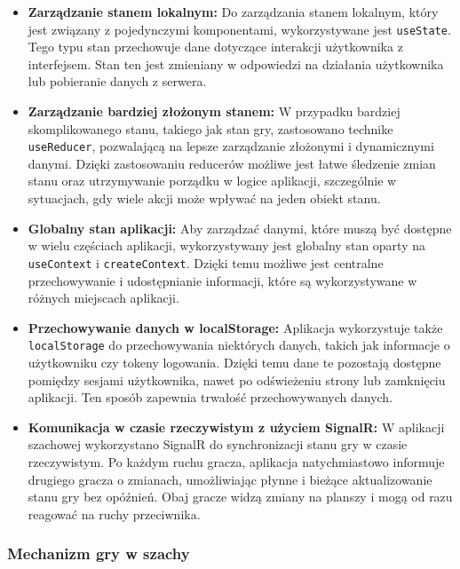 \documentclass[twoside]{projektInzynierskiMS1}
\begin{document}
\begin{itemize}
    \item \textbf{Zarządzanie stanem lokalnym:} Do zarządzania stanem lokalnym, który jest związany z pojedynczymi komponentami, wykorzystywane jest \texttt{useState}. Tego typu stan przechowuje dane dotyczące interakcji użytkownika z interfejsem. Stan ten jest zmieniany w odpowiedzi na działania użytkownika lub pobieranie danych z serwera.

    \item \textbf{Zarządzanie bardziej złożonym stanem:} W przypadku bardziej skomplikowanego stanu, takiego jak stan gry, zastosowano technike \texttt{useReducer}, pozwalającą na lepsze zarządzanie złożonymi i dynamicznymi danymi. Dzięki zastosowaniu reducerów możliwe jest łatwe śledzenie zmian stanu oraz utrzymywanie porządku w logice aplikacji, szczególnie w sytuacjach, gdy wiele akcji może wpływać na jeden obiekt stanu.

    \item \textbf{Globalny stan aplikacji:} Aby zarządzać danymi, które muszą być dostępne w wielu częściach aplikacji, wykorzystywany jest globalny stan oparty na \texttt{useContext} i \texttt{createContext}. Dzięki temu możliwe jest centralne przechowywanie i udostępnianie informacji, które są wykorzystywane w różnych miejscach aplikacji.

    \item \textbf{Przechowywanie danych w localStorage:} Aplikacja wykorzystuje także \texttt{localStorage} do przechowywania niektórych danych, takich jak informacje o użytkowniku czy tokeny logowania. Dzięki temu dane te pozostają dostępne pomiędzy sesjami użytkownika, nawet po odświeżeniu strony lub zamknięciu aplikacji. Ten sposób zapewnia trwałość przechowywanych danych.

    \item \textbf{Komunikacja w czasie rzeczywistym z użyciem SignalR:} W aplikacji szachowej wykorzystano SignalR do synchronizacji stanu gry w czasie rzeczywistym. Po każdym ruchu gracza, aplikacja natychmiastowo informuje drugiego gracza o zmianach, umożliwiając płynne i bieżące aktualizowanie stanu gry bez opóźnień. Obaj gracze widzą zmiany na planszy i mogą od razu reagować na ruchy przeciwnika.

\end{itemize}

\newpage

\subsubsection{Mechanizm gry w szachy}
\end{document}
